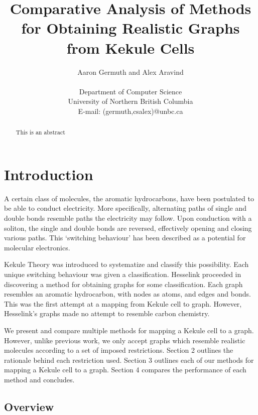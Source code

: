 \documentclass[12pt]{article}
\begin{document}
\title{Comparative Analysis of Methods for Obtaining Realistic Graphs from Kekule Cells}
\author{Aaron Germuth and Alex Aravind \\\\  
Department of Computer Science \\
University of Northern British Columbia \\
E-mail: (germuth,csalex)@unbc.ca}
\maketitle


\begin{abstract}

This is an abstract

\end{abstract}

\section{Introduction}

A certain class of molecules, the aromatic hydrocarbons, have been postulated to be able to conduct electricity. More specifically, alternating paths of single and double bonds resemble paths the electricity may follow. Upon conduction with a soliton, the single and double bonds are reversed, effectively opening and closing various paths. This ‘switching behaviour’ has been described as a potential for molecular electronics. 

Kekule Theory was introduced to systematize and classify this possibility. Each unique switching behaviour was given a classification. Hesselink proceeded in discovering a method for obtaining graphs for some classification. Each graph resembles an aromatic hydrocarbon, with nodes as atoms, and edges and bonds. This was the first attempt at a mapping from Kekule cell to graph. However, Hesselink’s graphs made no attempt to resemble carbon chemistry. 

We present and compare multiple methods for mapping a Kekule cell to a graph. However, unlike previous work, we only accept graphs which resemble realistic molecules according to a set of imposed restrictions. Section 2 outlines the rationale behind each restriction used. Section 3 outlines each of our methods for mapping a Kekule cell to a graph. Section 4 compares the performance of each method and concludes. 

\subsection{Overview}
\end{document}
